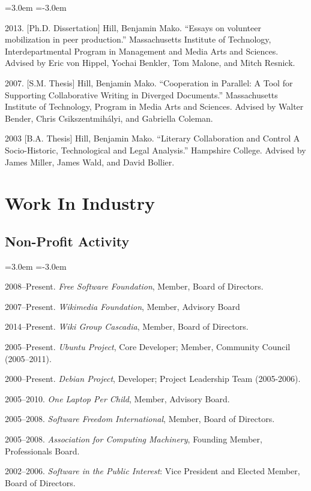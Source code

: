 \documentclass[10pt]{article}
\newenvironment{cvlist}{
\begin{list}{}{\leftmargin=3.0em \itemindent=-3.0em}
  \setlength{\itemsep}{0pt}
  \setlength{\parskip}{0em}
  \setlength{\parsep}{1em}
  \setlength{\parindent}{0em}}
{\vspace{1em}
\end{list}}
\begin{document}
\begin{cvlist}
\item 2013. [Ph.D. Dissertation] Hill, Benjamin Mako. ``Essays on volunteer mobilization in peer production.'' Massachusetts Institute of Technology, Interdepartmental Program in Management and Media Arts and Sciences. Advised by Eric von Hippel, Yochai Benkler, Tom Malone, and Mitch Resnick.
\item 2007. [S.M. Thesis] Hill, Benjamin Mako. ``Cooperation in Parallel: A Tool for Supporting Collaborative Writing in Diverged Documents.'' Massachusetts Institute of Technology, Program in Media Arts and Sciences. Advised by Walter Bender, Chris Csikszentmihályi, and Gabriella Coleman.
\item 2003 [B.A. Thesis] Hill, Benjamin Mako. ``Literary Collaboration and Control A Socio-Historic, Technological and Legal Analysis.'' Hampshire College. Advised by James Miller, James Wald, and David Bollier.
\end{cvlist}

\section{Work In Industry}

\subsection{Non-Profit Activity}
\begin{cvlist}
\item 2008--Present. \emph{Free Software Foundation}, Member, Board of Directors.
\item 2007--Present. \emph{Wikimedia Foundation}, Member, Advisory Board
\item 2014--Present. \emph{Wiki Group Cascadia}, Member, Board of Directors.
\item 2005--Present. \emph{Ubuntu Project}, Core Developer; Member, Community Council (2005--2011).
\item 2000--Present. \emph{Debian Project}, Developer; Project Leadership Team (2005-2006).
\item 2005--2010. \emph{One Laptop Per Child}, Member, Advisory Board. %
\item 2005--2008. \emph{Software Freedom International}, Member, Board of Directors.
\item 2005--2008. \emph{Association for Computing Machinery}, Founding Member, Professionals Board.
\item 2002--2006. \emph{Software in the Public Interest}: Vice President and Elected Member, Board of Directors.
\end{cvlist}
\end{document}
